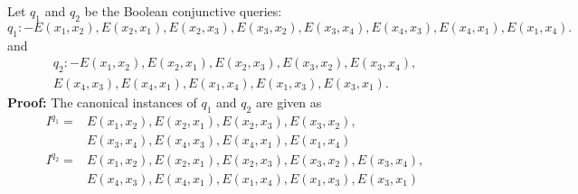Let $q_1$ and $q_2$ be the Boolean conjunctive queries:
\begin{equation*}
  q_1 :- E(x_1,x_2),E(x_2,x_1),E(x_2,x_3),E(x_3,x_2),E(x_3,x_4),E(x_4,x_3),E(x_4,x_1),E(x_1,x_4).
\end{equation*}
and 
\begin{align*}
  q_2 :- E(x_1,x_2),E(x_2,x_1),E(x_2,x_3),E(x_3,x_2),E(x_3,x_4), \\ 
  E(x_4,x_3),E(x_4,x_1),E(x_1,x_4),E(x_1,x_3),E(x_3,x_1).
\end{align*} 
\textbf{Proof:} The canonical instances of $q_1$ and $q_2$ are given as 
\begin{align*}
  I^{q_1} = &E(x_1,x_2),E(x_2,x_1),E(x_2,x_3),E(x_3,x_2), \\
            &E(x_3,x_4),E(x_4,x_3),E(x_4,x_1),E(x_1,x_4) \\
  I^{q_2} = &E(x_1,x_2),E(x_2,x_1),E(x_2,x_3),E(x_3,x_2),E(x_3,x_4), \\ 
            &E(x_4,x_3),E(x_4,x_1),E(x_1,x_4),E(x_1,x_3),E(x_3,x_1)
\end{align*}
